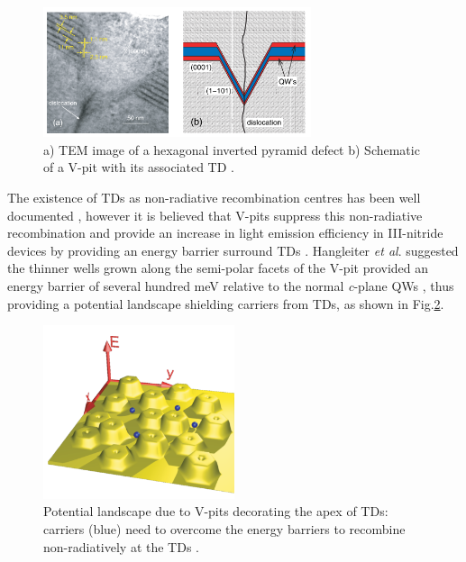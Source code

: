 \begin{figure}[h]
	\centering
	\includegraphics[width=0.7\textwidth]{Figs/Ch1/vpit.png}
	\caption {a) TEM image of a hexagonal inverted pyramid defect b) Schematic  of a V-pit with its associated TD \cite{Hangleiter2005}.}
	\label{1.8}
\end{figure}
\FloatBarrier 

The existence of TDs as non-radiative recombination centres has been well documented \cite{Bennett2010b}, however it is believed that V-pits suppress this non-radiative recombination and provide an increase in light emission efficiency in III-nitride devices by providing an energy barrier surround TDs \cite{Hangleiter2005}. Hangleiter {\it et al}. suggested the thinner wells grown along the semi-polar facets of the V-pit provided an energy barrier of several hundred meV relative to the normal {\it c}-plane QWs \cite{Hangleiter2005}, thus providing a potential landscape shielding carriers from TDs, as shown in Fig.\ref{1.9}.

\begin{figure}[h]
	\centering
	\includegraphics[width=0.5\textwidth]{Figs/Ch1/landscape.png}
	\caption {Potential landscape due to V-pits decorating the apex of TDs: carriers (blue) need to overcome the energy barriers to recombine non-radiatively at the TDs \cite{Hangleiter2005}.}
	\label{1.9}
\end{figure}
\FloatBarrier 

 
